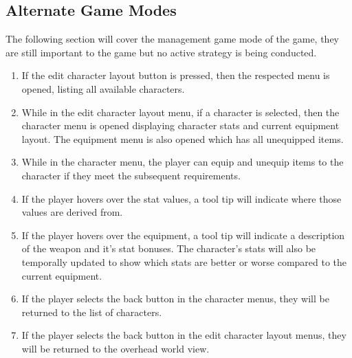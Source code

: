 \documentclass{article}
\begin{document}
\subsection{Alternate Game Modes}
\quad The following section will cover the management game mode of the game, they are still important to the game but no active strategy is being conducted.
\begin{enumerate}[{AGR}1. ]
	\item If the edit character layout button is pressed, then the respected menu is opened, listing all available characters.
	\item While in the edit character layout menu, if a character is selected, then the character menu is opened displaying character stats and current equipment layout. The equipment menu is also opened which has all unequipped items.
	\item While in the character menu, the player can equip and unequip items to the character if they meet the subsequent requirements.
	\item If the player hovers over the stat values, a tool tip will indicate where those values are derived from.
	\item If the player hovers over the equipment, a tool tip will indicate a description of the weapon and it's stat bonuses. The character's stats will also be temporally updated to show which stats are better or worse compared to the current equipment.
	\item If the player selects the back button in the character menus, they will be returned to the list of characters.
	\item  If the player selects the back button in the edit character layout menus, they will be returned to the overhead world view.
\end{enumerate}
\end{document}
